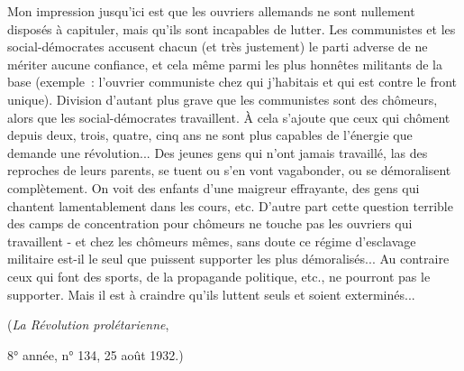 \documentclass[french,twoside]{book} %
\begin{document}
Mon impression jusqu'ici est que les ouvriers allemands ne sont nullement disposés à capituler, mais qu'ils sont incapables de lutter. Les communistes et les social-démocrates accusent chacun (et très justement) le parti adverse de ne mériter aucune confiance, et cela même parmi les plus honnêtes militants de la base (exemple : l'ouvrier communiste chez qui j'habitais et qui est contre le front unique). Division d'autant plus grave que les communistes sont des chômeurs, alors que les social-démocrates travaillent. À cela s'ajoute que ceux qui chôment depuis deux, trois, quatre, cinq ans ne sont plus capables de l'énergie que demande une révolution... Des jeunes gens qui n'ont jamais tra­vaillé, las des reproches de leurs parents, se tuent ou s'en vont vagabonder, ou se démoralisent complètement. On voit des enfants d'une maigreur effrayante, des gens qui chantent lamentablement dans les cours, etc. D'autre part cette question terrible des camps de concentration pour chômeurs ne touche pas les ouvriers qui travaillent - et chez les chômeurs mêmes, sans doute ce régime d'esclavage militaire est-il le seul que puissent supporter les plus démora­lisés... Au contraire ceux qui font des sports, de la propagande politique, etc., ne pourront pas le supporter. Mais il est à craindre qu'ils luttent seuls et soient exterminés...\par
({\itshape La Révolution prolétarienne},\par
8° année, n° 134, 25 août 1932.)\par
\end{document}
